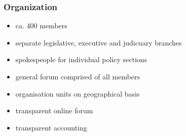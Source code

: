 \begin{frame}
	\frametitle{Organization}
	\begin{itemize}
		\item ca. 400 members
		\item separate legislative, executive and judicuary branches
		\item spokespeople for individual policy sections
		\item general forum comprised of all members
		\item organisation units on geographical basis
		\item transparent online forum
		\item transparent accounting
	\end{itemize}
	
	

\end{frame}
